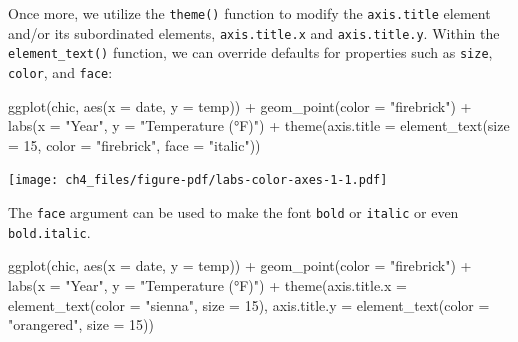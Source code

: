 \documentclass[
  letterpaper,
]{scrbook}
\newenvironment{Shaded}{\begin{snugshade}}{\end{snugshade}}
\newcommand{\AttributeTok}[1]{\textcolor[rgb]{0.40,0.45,0.13}{#1}}
\newcommand{\DecValTok}[1]{\textcolor[rgb]{0.68,0.00,0.00}{#1}}
\newcommand{\FunctionTok}[1]{\textcolor[rgb]{0.28,0.35,0.67}{#1}}
\newcommand{\NormalTok}[1]{\textcolor[rgb]{0.00,0.23,0.31}{#1}}
\newcommand{\SpecialCharTok}[1]{\textcolor[rgb]{0.37,0.37,0.37}{#1}}
\newcommand{\StringTok}[1]{\textcolor[rgb]{0.13,0.47,0.30}{#1}}
\begin{document}
Once more, we utilize the \texttt{theme()} function to modify the
\texttt{axis.title} element and/or its subordinated elements,
\texttt{axis.title.x} and \texttt{axis.title.y}. Within the
\texttt{element\_text()} function, we can override defaults for
properties such as \texttt{size}, \texttt{color}, and \texttt{face}:

\begin{Shaded}
\begin{Highlighting}[]
\FunctionTok{ggplot}\NormalTok{(chic, }\FunctionTok{aes}\NormalTok{(}\AttributeTok{x =}\NormalTok{ date, }\AttributeTok{y =}\NormalTok{ temp)) }\SpecialCharTok{+}
  \FunctionTok{geom\_point}\NormalTok{(}\AttributeTok{color =} \StringTok{"firebrick"}\NormalTok{) }\SpecialCharTok{+}
  \FunctionTok{labs}\NormalTok{(}\AttributeTok{x =} \StringTok{"Year"}\NormalTok{, }\AttributeTok{y =} \StringTok{"Temperature (°F)"}\NormalTok{) }\SpecialCharTok{+}
  \FunctionTok{theme}\NormalTok{(}\AttributeTok{axis.title =} \FunctionTok{element\_text}\NormalTok{(}\AttributeTok{size =} \DecValTok{15}\NormalTok{, }\AttributeTok{color =} \StringTok{"firebrick"}\NormalTok{,}
                                  \AttributeTok{face =} \StringTok{"italic"}\NormalTok{))}
\end{Highlighting}
\end{Shaded}

\texttt{[image: ch4\_files/figure-pdf/labs-color-axes-1-1.pdf]}

The \texttt{face} argument can be used to make the font \texttt{bold} or
\texttt{italic} or even \texttt{bold.italic}.

\begin{Shaded}
\begin{Highlighting}[]
\FunctionTok{ggplot}\NormalTok{(chic, }\FunctionTok{aes}\NormalTok{(}\AttributeTok{x =}\NormalTok{ date, }\AttributeTok{y =}\NormalTok{ temp)) }\SpecialCharTok{+}
  \FunctionTok{geom\_point}\NormalTok{(}\AttributeTok{color =} \StringTok{"firebrick"}\NormalTok{) }\SpecialCharTok{+}
  \FunctionTok{labs}\NormalTok{(}\AttributeTok{x =} \StringTok{"Year"}\NormalTok{, }\AttributeTok{y =} \StringTok{"Temperature (°F)"}\NormalTok{) }\SpecialCharTok{+}
  \FunctionTok{theme}\NormalTok{(}\AttributeTok{axis.title.x =} \FunctionTok{element\_text}\NormalTok{(}\AttributeTok{color =} \StringTok{"sienna"}\NormalTok{, }\AttributeTok{size =} \DecValTok{15}\NormalTok{),}
        \AttributeTok{axis.title.y =} \FunctionTok{element\_text}\NormalTok{(}\AttributeTok{color =} \StringTok{"orangered"}\NormalTok{, }\AttributeTok{size =} \DecValTok{15}\NormalTok{))}
\end{Highlighting}
\end{Shaded}
\end{document}
